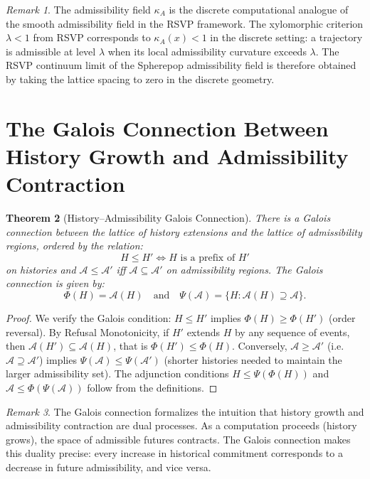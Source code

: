 \documentclass[12pt, a4paper, openany]{book}
\theoremstyle{plain}
\newtheorem{theorem}{Theorem}[chapter]
\theoremstyle{definition}
\theoremstyle{remark}
\newtheorem{remark}[theorem]{Remark}
\newcommand{\calA}{\mathcal{A}}
\begin{document}
\begin{remark}
The admissibility field $\kappa_A$ is the discrete computational analogue of
the smooth admissibility field in the RSVP framework. The xylomorphic criterion
$\lambda < 1$ from RSVP corresponds to $\kappa_A(x) < 1$ in the discrete
setting: a trajectory is admissible at level $\lambda$ when its local admissibility
curvature exceeds $\lambda$. The RSVP continuum limit of the Spherepop admissibility
field is therefore obtained by taking the lattice spacing to zero in the discrete
geometry.
\end{remark}

\section{The Galois Connection Between History Growth and Admissibility Contraction}

\begin{theorem}[History--Admissibility Galois Connection]
There is a Galois connection between the lattice of history extensions and the
lattice of admissibility regions, ordered by the relation:
\[
H \leq H' \iff H \text{ is a prefix of } H'
\]
on histories and $\calA \leq \calA'$ iff $\calA \subseteq \calA'$ on admissibility
regions. The Galois connection is given by:
\[
\Phi(H) = \calA(H) \quad \text{and} \quad \Psi(\calA) = \{H : \calA(H) \supseteq \calA\}.
\]
\end{theorem}

\begin{proof}
We verify the Galois condition: $H \leq H'$ implies $\Phi(H) \geq \Phi(H')$
(order reversal). By Refusal Monotonicity, if $H'$ extends $H$ by any sequence
of events, then $\calA(H') \subseteq \calA(H)$, that is $\Phi(H') \leq \Phi(H)$.
Conversely, $\calA \geq \calA'$ (i.e.\ $\calA \supseteq \calA'$) implies
$\Psi(\calA) \leq \Psi(\calA')$ (shorter histories needed to maintain the larger
admissibility set). The adjunction conditions $H \leq \Psi(\Phi(H))$ and
$\calA \leq \Phi(\Psi(\calA))$ follow from the definitions.
\end{proof}

\begin{remark}
The Galois connection formalizes the intuition that history growth and admissibility
contraction are dual processes. As a computation proceeds (history grows), the
space of admissible futures contracts. The Galois connection makes this duality
precise: every increase in historical commitment corresponds to a decrease in
future admissibility, and vice versa.
\end{remark}
\end{document}
